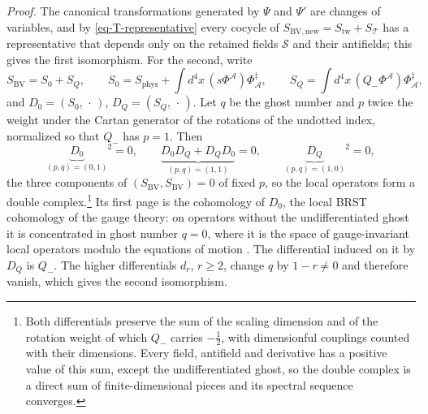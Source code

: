 \documentclass[11pt]{article}
\numberwithin{equation}{section}
\numberwithin{figure}{section}
\numberwithin{table}{section}
\begin{document}
\emph{Proof.} The canonical transformations generated by $\Psi$ and $\Psi'$ are changes of variables, and by \eqref{eq-T-representative} every cocycle of $S_{\mathrm{BV,new}}=S_{\mathrm{tw}}+S_{\mathcal T}$ has a representative that depends only on the retained fields $\mathcal S$ and their antifields; this gives the first isomorphism. For the second, write
\begin{equation*}
S_{\mathrm{BV}}=S_0+S_Q,\qquad
S_0=S_{\mathrm{phys}}+\int d^4x\,(s\Phi^{\mathcal A})\Phi^\ddagger_{\mathcal A},\qquad
S_Q=\int d^4x\,(Q_-\Phi^{\mathcal A})\Phi^\ddagger_{\mathcal A},
\end{equation*}
and $D_0=(S_0,\,\cdot\,)$, $D_Q=(S_Q,\,\cdot\,)$. Let $q$ be the ghost number and $p$ twice the weight under the Cartan generator of the rotations of the undotted index, normalized so that $Q_-$ has $p=1$. Then
\begin{equation*}
\underbrace{D_0}_{(p,q)=(0,1)}{}^{2}=0,\qquad
\underbrace{D_0D_Q+D_QD_0}_{(p,q)=(1,1)}=0,\qquad
\underbrace{D_Q}_{(p,q)=(1,0)}{}^{2}=0,
\end{equation*}
the three components of $(S_{\mathrm{BV}},S_{\mathrm{BV}})=0$ of fixed $p$, so the local operators form a double complex.\footnote{\label{fn-weight}Both differentials preserve the sum of the scaling dimension and of the rotation weight of which $Q_-$ carries $-\frac12$, with dimensionful couplings counted with their dimensions. Every field, antifield and derivative has a positive value of this sum, except the undifferentiated ghost, so the double complex is a direct sum of finite-dimensional pieces and its spectral sequence converges.} Its first page is the cohomology of $D_0$, the local BRST cohomology of the gauge theory: on operators without the undifferentiated ghost it is concentrated in ghost number $q=0$, where it is the space of gauge-invariant local operators modulo the equations of motion \cite{BBH}. The differential induced on it by $D_Q$ is $Q_-$. The higher differentials $d_r$, $r\ge2$, change $q$ by $1-r\ne0$ and therefore vanish, which gives the second isomorphism.~\hfill\qedsymbol
\end{document}
